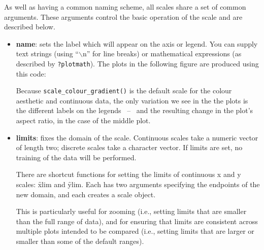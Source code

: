 As well as having a common naming scheme, all scales share a set of common arguments.  These arguments control the basic operation of the scale and are described below.

\begin{itemize}
  \item {\bf name}:  sets the label which will appear on the axis or legend. You can supply text strings (using ``$\backslash$n'' for line breaks) or mathematical expressions (as described by \verb|?plotmath|).  The plots in the following figure are produced using this code:

    

  Because {\tt scale\_colour\_gradient()} is the default scale for the colour aesthetic and continuous data, the only variation we see in the the plots is the different labels on the legends ~--~ and the resulting change in the plot's aspect ratio, in the case of the middle plot.

    

  \item {\bf limits}: fixes the domain of the scale.   Continuous scales take a numeric vector of length two; discrete scales take a character vector. If limits are set, no training of the data will be performed.  
  
  There are shortcut functions for setting the limits of continuous x and y scales: \f{xlim} and \f{ylim}.  Each has two arguments specifying the endpoints of the new domain, and each creates a scale object.  
  
  This is particularly useful for zooming (i.e., setting limits that are smaller than the full range of data), and for ensuring that limits are consistent across multiple plots intended to be compared (i.e., setting limits that are larger or smaller than some of the default ranges).  
  

\end{itemize}
